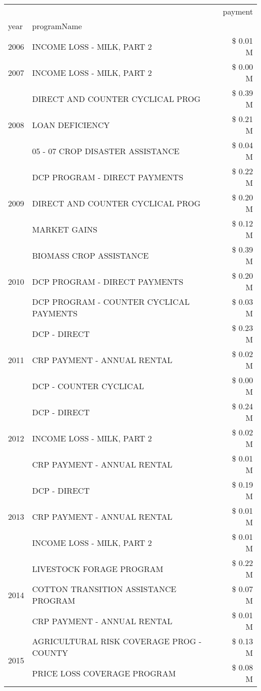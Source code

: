 \begin{tabular}{llr}
\toprule
 &  & payment \\
year & programName &  \\
\midrule
2006 & INCOME LOSS - MILK, PART 2 & \$ 0.01 M \\
\cline{1-3}
2007 & INCOME LOSS - MILK, PART 2 & \$ 0.00 M \\
\cline{1-3}
\multirow[t]{3}{*}{2008} & DIRECT AND COUNTER CYCLICAL PROG & \$ 0.39 M \\
 & LOAN DEFICIENCY & \$ 0.21 M \\
 & 05 - 07 CROP DISASTER ASSISTANCE & \$ 0.04 M \\
\cline{1-3}
\multirow[t]{3}{*}{2009} & DCP PROGRAM - DIRECT PAYMENTS & \$ 0.22 M \\
 & DIRECT AND COUNTER CYCLICAL PROG & \$ 0.20 M \\
 & MARKET GAINS & \$ 0.12 M \\
\cline{1-3}
\multirow[t]{3}{*}{2010} & BIOMASS CROP ASSISTANCE & \$ 0.39 M \\
 & DCP PROGRAM - DIRECT PAYMENTS & \$ 0.20 M \\
 & DCP PROGRAM - COUNTER CYCLICAL PAYMENTS & \$ 0.03 M \\
\cline{1-3}
\multirow[t]{3}{*}{2011} & DCP - DIRECT & \$ 0.23 M \\
 & CRP PAYMENT - ANNUAL RENTAL & \$ 0.02 M \\
 & DCP - COUNTER CYCLICAL & \$ 0.00 M \\
\cline{1-3}
\multirow[t]{3}{*}{2012} & DCP - DIRECT & \$ 0.24 M \\
 & INCOME LOSS - MILK, PART 2 & \$ 0.02 M \\
 & CRP PAYMENT - ANNUAL RENTAL & \$ 0.01 M \\
\cline{1-3}
\multirow[t]{3}{*}{2013} & DCP - DIRECT & \$ 0.19 M \\
 & CRP PAYMENT - ANNUAL RENTAL & \$ 0.01 M \\
 & INCOME LOSS - MILK, PART 2 & \$ 0.01 M \\
\cline{1-3}
\multirow[t]{3}{*}{2014} & LIVESTOCK FORAGE PROGRAM & \$ 0.22 M \\
 & COTTON TRANSITION ASSISTANCE PROGRAM & \$ 0.07 M \\
 & CRP PAYMENT - ANNUAL RENTAL & \$ 0.01 M \\
\cline{1-3}
\multirow[t]{3}{*}{2015} & AGRICULTURAL RISK COVERAGE PROG - COUNTY & \$ 0.13 M \\
 & PRICE LOSS COVERAGE PROGRAM & \$ 0.08 M \\

\end{tabular}
